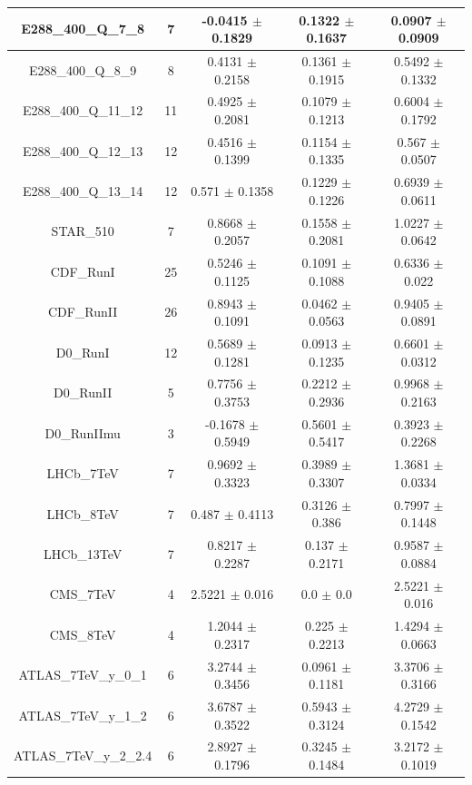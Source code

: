 \documentclass[
]{article}
\begin{document}
\begin{table}[h]
\begin{tabular}{|c|c|c|c|c|}
E288\_400\_Q\_7\_8 & 7 & -0.0415 \(\pm\) 0.1829 & 0.1322 \(\pm\)
0.1637 & 0.0907 \(\pm\) 0.0909 \\ \hline
E288\_400\_Q\_8\_9 & 8 & 0.4131 \(\pm\) 0.2158 & 0.1361 \(\pm\)
0.1915 & 0.5492 \(\pm\) 0.1332 \\ \hline
E288\_400\_Q\_11\_12 & 11 & 0.4925 \(\pm\) 0.2081 & 0.1079 \(\pm\)
0.1213 & 0.6004 \(\pm\) 0.1792 \\ \hline
E288\_400\_Q\_12\_13 & 12 & 0.4516 \(\pm\) 0.1399 & 0.1154 \(\pm\)
0.1335 & 0.567 \(\pm\) 0.0507 \\ \hline
E288\_400\_Q\_13\_14 & 12 & 0.571 \(\pm\) 0.1358 & 0.1229 \(\pm\)
0.1226 & 0.6939 \(\pm\) 0.0611 \\ \hline
STAR\_510 & 7 & 0.8668 \(\pm\) 0.2057 & 0.1558 \(\pm\) 0.2081 & 1.0227
\(\pm\) 0.0642 \\ \hline
CDF\_RunI & 25 & 0.5246 \(\pm\) 0.1125 & 0.1091 \(\pm\) 0.1088 & 0.6336
\(\pm\) 0.022 \\ \hline
CDF\_RunII & 26 & 0.8943 \(\pm\) 0.1091 & 0.0462 \(\pm\) 0.0563 & 0.9405
\(\pm\) 0.0891 \\ \hline
D0\_RunI & 12 & 0.5689 \(\pm\) 0.1281 & 0.0913 \(\pm\) 0.1235 & 0.6601
\(\pm\) 0.0312 \\ \hline
D0\_RunII & 5 & 0.7756 \(\pm\) 0.3753 & 0.2212 \(\pm\) 0.2936 & 0.9968
\(\pm\) 0.2163 \\ \hline
D0\_RunIImu & 3 & -0.1678 \(\pm\) 0.5949 & 0.5601 \(\pm\)
0.5417 & 0.3923 \(\pm\) 0.2268 \\ \hline
LHCb\_7TeV & 7 & 0.9692 \(\pm\) 0.3323 & 0.3989 \(\pm\) 0.3307 & 1.3681
\(\pm\) 0.0334 \\ \hline
LHCb\_8TeV & 7 & 0.487 \(\pm\) 0.4113 & 0.3126 \(\pm\) 0.386 & 0.7997
\(\pm\) 0.1448 \\ \hline
LHCb\_13TeV & 7 & 0.8217 \(\pm\) 0.2287 & 0.137 \(\pm\) 0.2171 & 0.9587
\(\pm\) 0.0884 \\ \hline
CMS\_7TeV & 4 & 2.5221 \(\pm\) 0.016 & 0.0 \(\pm\) 0.0 & 2.5221 \(\pm\)
0.016 \\ \hline
CMS\_8TeV & 4 & 1.2044 \(\pm\) 0.2317 & 0.225 \(\pm\) 0.2213 & 1.4294
\(\pm\) 0.0663 \\ \hline
ATLAS\_7TeV\_y\_0\_1 & 6 & 3.2744 \(\pm\) 0.3456 & 0.0961 \(\pm\)
0.1181 & 3.3706 \(\pm\) 0.3166 \\ \hline
ATLAS\_7TeV\_y\_1\_2 & 6 & 3.6787 \(\pm\) 0.3522 & 0.5943 \(\pm\)
0.3124 & 4.2729 \(\pm\) 0.1542 \\ \hline
ATLAS\_7TeV\_y\_2\_2.4 & 6 & 2.8927 \(\pm\) 0.1796 & 0.3245 \(\pm\)
0.1484 & 3.2172 \(\pm\) 0.1019 \\ \hline

\end{tabular}
\end{table}
\end{document}
